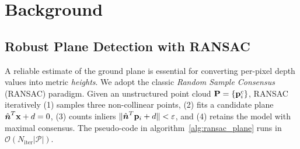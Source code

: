 




\section{Background}

\subsection{Robust Plane Detection with RANSAC}
A reliable estimate of the ground plane is essential for converting per-pixel
depth values into metric \emph{heights}. We adopt the classic \emph{Random Sample Consensus} (RANSAC) paradigm. Given an unstructured point cloud $\mathbf{P}=\{\mathbf{p}^c_i\}$, RANSAC iteratively (1) samples three non-collinear points, (2) fits a candidate plane $\hat{\boldsymbol{n}}^T\mathbf{x}+d=0$, (3) counts inliers $\|\hat{\boldsymbol{n}}^T\mathbf{p}_i+d\|<\varepsilon$, and (4) retains the model with maximal consensus.  The pseudo-code in algorithm~\autoref{alg:ransac_plane} runs in $\mathcal{O}(N_\text{iter}|\mathcal{P}|)$\cite{Open3DDocsPrimary252c867,spatialvlmChen2024}.


